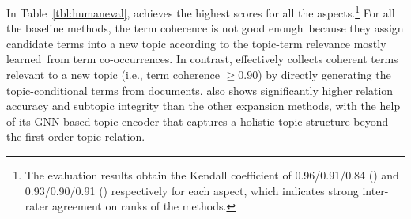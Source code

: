 In Table~\ref{tbl:humaneval}, \proposed achieves the highest scores for all the aspects.\footnote{The evaluation results obtain the Kendall coefficient of 0.96/0.91/0.84 (\amazon) and 0.93/0.90/0.91 (\dbpedia) respectively for each aspect, which indicates strong inter-rater agreement on ranks of the methods.}
For all the baseline methods, the term coherence is not good enough~because they assign candidate terms into a new topic according to the topic-term relevance mostly learned~from term co-occurrences.
In contrast, \proposed effectively collects coherent terms relevant to a new topic (i.e., term coherence $\geq 0.90$) by directly generating the topic-conditional terms from documents.
\proposed also shows significantly higher relation accuracy and subtopic integrity than the other expansion methods, with the help of its GNN-based topic encoder that captures a holistic topic structure beyond the first-order topic relation.




